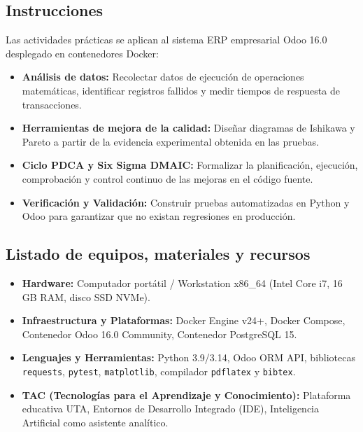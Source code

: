 \documentclass{article}
\begin{document}
\subsection{Instrucciones}
Las actividades prácticas se aplican al sistema ERP empresarial Odoo 16.0 desplegado en contenedores Docker:
\begin{itemize}
    \item \textbf{Análisis de datos:} Recolectar datos de ejecución de operaciones matemáticas, identificar registros fallidos y medir tiempos de respuesta de transacciones.
    \item \textbf{Herramientas de mejora de la calidad:} Diseñar diagramas de Ishikawa y Pareto a partir de la evidencia experimental obtenida en las pruebas.
    \item \textbf{Ciclo PDCA y Six Sigma DMAIC:} Formalizar la planificación, ejecución, comprobación y control continuo de las mejoras en el código fuente.
    \item \textbf{Verificación y Validación:} Construir pruebas automatizadas en Python y Odoo para garantizar que no existan regresiones en producción.
\end{itemize}

\subsection{Listado de equipos, materiales y recursos}
\begin{itemize}
    \item \textbf{Hardware:} Computador portátil / Workstation x86\_64 (Intel Core i7, 16 GB RAM, disco SSD NVMe).
    \item \textbf{Infraestructura y Plataformas:} Docker Engine v24+, Docker Compose, Contenedor Odoo 16.0 Community, Contenedor PostgreSQL 15.
    \item \textbf{Lenguajes y Herramientas:} Python 3.9/3.14, Odoo ORM API, bibliotecas \texttt{requests}, \texttt{pytest}, \texttt{matplotlib}, compilador \texttt{pdflatex} y \texttt{bibtex}.
    \item \textbf{TAC (Tecnologías para el Aprendizaje y Conocimiento):} Plataforma educativa UTA, Entornos de Desarrollo Integrado (IDE), Inteligencia Artificial como asistente analítico.
\end{itemize}
\end{document}

